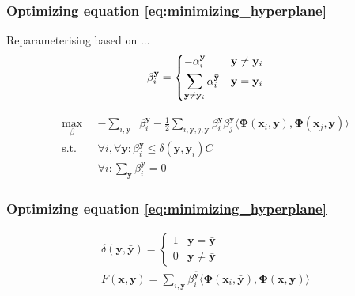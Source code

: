 \documentclass[mathserif,handout]{beamer}
\DeclareMathOperator{\struckDelta}{\Delta \left( \mathbf{y}, \mathbf{y}_i \right)}
\DeclareMathOperator{\st}{\text{s.t.} \quad}
\begin{document}
\begin{frame}
    \frametitle{Optimizing equation \eqref{eq:minimizing_hyperplane}}
    Reparameterising based on ...
    \begin{equation}
        \beta_i^\mathbf{y} = \begin{dcases}
                                -\alpha_i^\mathbf{y} & \mathbf{y} \ne \mathbf{y}_i \\
                                \sum_{\mathbf{\bar{y}} \ne \mathbf{y}_i} \alpha_i^\mathbf{\bar{y}} & \mathbf{y} = \mathbf{y}_i
                             \end{dcases}
    \end{equation}

    \begin{equation}
        \begin{aligned}
            \max_{\beta} & -\sum_{i,\mathbf{y}} \struckDelta \beta_i^\mathbf{y} -
                \frac{1}{2} \sum_{i,\mathbf{y},j,\mathbf{\bar{y}}} \beta_i^\mathbf{y}
                \beta_j^\mathbf{\bar{y}} \langle \mathbf{\Phi}\left( \mathbf{x}_i, \mathbf{y}
                \right), \mathbf{\Phi}\left( \mathbf{x}_j, \mathbf{\bar{y}} \right) \rangle \\
            \st & \forall i, \forall \mathbf{y} : \beta_i^\mathbf{y} \le \delta(\mathbf{y}, \mathbf{y}_i) C \\
                & \forall i: \sum_\mathbf{y} \beta_i^\mathbf{y} = 0
        \end{aligned}
    \end{equation}
\end{frame}
\begin{frame}
    \frametitle{Optimizing equation \eqref{eq:minimizing_hyperplane}}
    \begin{gather}
        \delta(\mathbf{y}, \mathbf{\bar{y}}) = \begin{cases}
                                                    1 & \mathbf{y} = \mathbf{\bar{y}} \\
                                                    0 & \mathbf{y} \ne \mathbf{\bar{y}}
                                               \end{cases} \\
        F(\mathbf{x}, \mathbf{y}) = \sum_{i, \mathbf{\bar{y}}} \beta_i^\mathbf{\bar{y}} \langle
            \mathbf{\Phi}(\mathbf{x}_i, \mathbf{\bar{y}}), \mathbf{\Phi}(\mathbf{x}, \mathbf{y}) \rangle
    \end{gather}
\end{frame}
\end{document}
